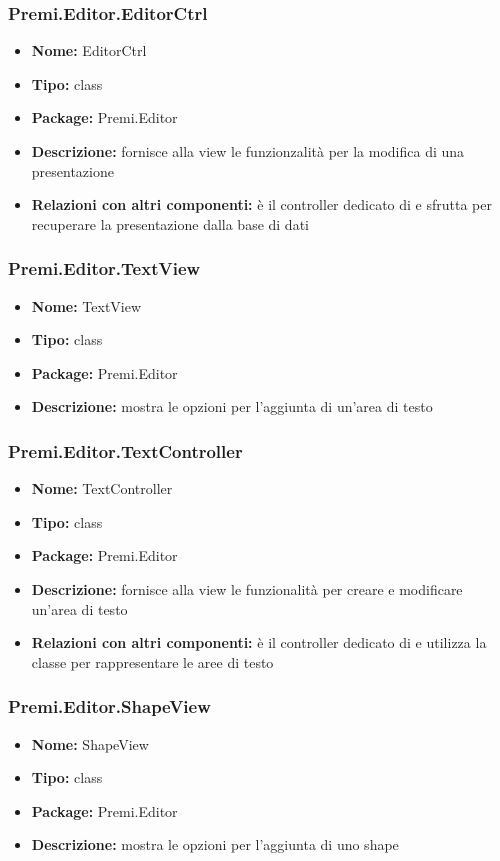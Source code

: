 \subsubsection{Premi.Editor.EditorCtrl}
\begin{itemize}
  \item \textbf{Nome:} EditorCtrl
  \item \textbf{Tipo:} class
  \item \textbf{Package:} Premi.Editor
  \item \textbf{Descrizione:} fornisce alla view le funzionzalità per la modifica di una presentazione
  \item \textbf{Relazioni con altri componenti:} è il controller dedicato di   e sfrutta  per recuperare la presentazione dalla base di dati
\end{itemize}
\subsubsection{Premi.Editor.TextView}
\begin{itemize}
  \item \textbf{Nome:} TextView
  \item \textbf{Tipo:} class
  \item \textbf{Package:} Premi.Editor
  \item \textbf{Descrizione:} mostra le opzioni per l'aggiunta di un'area di testo
\end{itemize}
\subsubsection{Premi.Editor.TextController}
\begin{itemize}
  \item \textbf{Nome:} TextController
  \item \textbf{Tipo:} class
  \item \textbf{Package:} Premi.Editor
  \item \textbf{Descrizione:} fornisce alla view le funzionalità per creare e modificare un'area di testo
  \item \textbf{Relazioni con altri componenti:} è il controller dedicato di   e utilizza la classe  per rappresentare le aree di testo
\end{itemize}
\subsubsection{Premi.Editor.ShapeView}
\begin{itemize}
  \item \textbf{Nome:} ShapeView
  \item \textbf{Tipo:} class
  \item \textbf{Package:} Premi.Editor
  \item \textbf{Descrizione:} mostra le opzioni per l'aggiunta di uno shape
\end{itemize}
